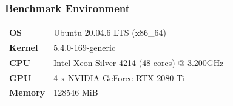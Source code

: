 \documentclass{article}
\begin{document}
\subsubsection{Benchmark Environment}

\begin{tabular}{ll}
\textbf{OS} & Ubuntu 20.04.6 LTS (x86\_64) \\
\textbf{Kernel} & 5.4.0-169-generic \\
\textbf{CPU} & Intel Xeon Silver 4214 (48 cores) @ 3.200GHz \\
\textbf{GPU} & 4 x NVIDIA GeForce RTX 2080 Ti \\
\textbf{Memory} & 128546 MiB \\
\end{tabular}
\end{document}

